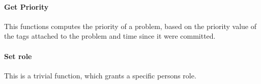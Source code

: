 \paragraph{Get Priority} This functions computes the priority of a problem, based on the priority value of the tags attached to the problem and time since it were committed. 



\paragraph{Set role} This is a trivial function, which grants a specific persons role.
